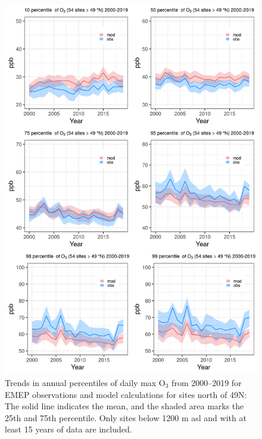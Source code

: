 \begin{figure}[h]
	\centering
	\includegraphics[width=0.74\paperwidth]{FIGS_TRENDS/alltrends_north_49_2000_2019_1200m.png}
	\caption{\label{fig:O3_perctrends_N}Trends in annual percentiles of daily max O$_3$ from 2000--2019 for EMEP observations and model calculations for sites north of 49\degrees N: The solid line indicates the mean, and the shaded area marks the 25th and 75th percentile. Only sites below 1200 m asl and with at least 15 years of data are included.}
\end{figure}

